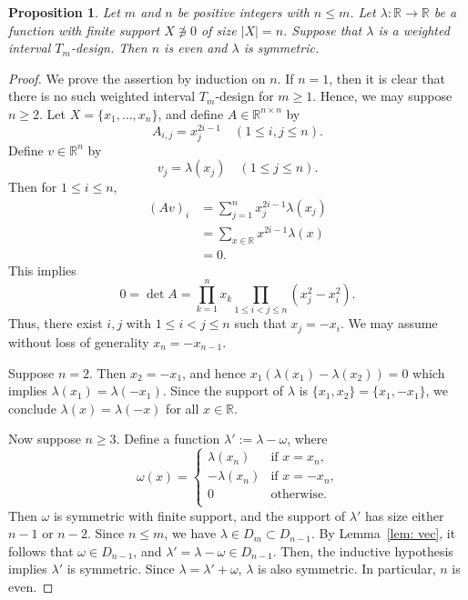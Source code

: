 \documentclass[11pt]{amsart}
\newtheorem{prop}[thm]{Proposition}
\theoremstyle{definition}
\newcommand{\R}{\mathbb{R}}
\newcommand{\allone}{\mathbf{1}}
\newcommand{\iantipodal}{symmetric}
\begin{document}
\begin{prop}\label{prop:f}
Let \( m \) and \( n \) be positive integers with \( n\le m \). Let \( \lambda \colon\R\to\R \) be a function with finite support \( X\not\ni 0 \) of size \( |X|=n \).  Suppose that \( \lambda \) is a weighted interval \( T_m \)-design. Then $n$ is even and \( \lambda \) is \iantipodal.
\end{prop}
\begin{proof}

We prove the assertion by induction on $n$.
If $n=1$, then it is clear that there is no such 
weighted interval $T_m$-design for $m\geq1$. 
Hence, we may suppose $n\ge 2$.
Let $X=\{x_1,\dots,x_n\}$,
and define $A\in\R^{n\times n}$ by
\[A_{i,j}=x_j^{2i-1}\quad(1\leq i,j\leq n).\]
Define $v\in\R^n$ by 
\[v_j=\lambda(x_j)\quad(1\leq j\leq n).\]
Then for $1\leq i\leq n$,
\begin{align*}
(Av)_i&=
\sum_{j=1}^n x_j^{2i-1} \lambda(x_j) \\
&=
\sum_{x\in\R} x^{2i-1} \lambda(x)
\\&=
0.
\end{align*}
This implies
\[
0=\det A =
\prod_{k=1}^n x_{k}\prod_{1\leq i<j\leq n}(x_j^2-x_i^2).
\]
Thus, 
there exist $i,j$ with $1\leq i<j\leq n$ such that $x_j=-x_i$.
We may assume without loss of generality $x_n=-x_{n-1}$.

Suppose $n=2$. 
Then 
$x_2=-x_1$, and hence $x_1(\lambda(x_1)-\lambda(x_2))=0$
which implies
$\lambda(x_1)=\lambda(-x_1)$. Since the support of $\lambda$ is $\{x_1,x_2\}=\{x_1,-x_1\}$, 
we conclude $\lambda(x)=\lambda(-x)$ for all $x\in\R$.

Now suppose $n\geq3$.
Define a function $\lambda' :=\lambda-\omega$, where
\[
\omega(x)=
\begin{cases}
\lambda(x_{n})&\text{if $x=x_{n}$,}\\
-\lambda(x_{n})&\text{if $x=-x_{n}$,}\\
0&\text{otherwise.}\\
\end{cases}
\]
Then $\omega$ is symmetric with finite support, and the support of $\lambda'$ has size either $n-1$ or $n-2$.
Since $n \le m$, we have $\lambda \in D_m \subset D_{n-1}$. By Lemma~\ref{lem: vec}, it follows that $\omega \in D_{n-1}$, and $\lambda'=\lambda-\omega \in D_{n-1}$. Then, the inductive hypothesis implies $\lambda'$ is symmetric. Since $\lambda=\lambda'+\omega$, $\lambda$ is also symmetric. In particular, $n$ is even.
\end{proof} 
\end{document}
